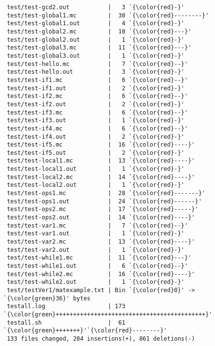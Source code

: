 \begin{lstlisting}
 test/test-gcd2.out           |   3 `{\color{red}-}'
 test/test-global1.mc         |  30 `{\color{red}--------}'
 test/test-global1.out        |   4 `{\color{red}-}'
 test/test-global2.mc         |  10 `{\color{red}---}'
 test/test-global2.out        |   1 `{\color{red}-}'
 test/test-global3.mc         |  11 `{\color{red}---}'
 test/test-global3.out        |   1 `{\color{red}-}'
 test/test-hello.mc           |   7 `{\color{red}--}'
 test/test-hello.out          |   3 `{\color{red}-}'
 test/test-if1.mc             |   6 `{\color{red}--}'
 test/test-if1.out            |   2 `{\color{red}-}'
 test/test-if2.mc             |   6 `{\color{red}--}'
 test/test-if2.out            |   2 `{\color{red}-}'
 test/test-if3.mc             |   6 `{\color{red}--}'
 test/test-if3.out            |   1 `{\color{red}-}'
 test/test-if4.mc             |   6 `{\color{red}--}'
 test/test-if4.out            |   2 `{\color{red}-}'
 test/test-if5.mc             |  16 `{\color{red}----}'
 test/test-if5.out            |   2 `{\color{red}-}'
 test/test-local1.mc          |  13 `{\color{red}----}'
 test/test-local1.out         |   1 `{\color{red}-}'
 test/test-local2.mc          |  14 `{\color{red}----}'
 test/test-local2.out         |   1 `{\color{red}-}'
 test/test-ops1.mc            |  28 `{\color{red}-------}'
 test/test-ops1.out           |  24 `{\color{red}------}'
 test/test-ops2.mc            |  17 `{\color{red}-----}'
 test/test-ops2.out           |  14 `{\color{red}----}'
 test/test-var1.mc            |   7 `{\color{red}--}'
 test/test-var1.out           |   1 `{\color{red}-}'
 test/test-var2.mc            |  13 `{\color{red}----}'
 test/test-var2.out           |   1 `{\color{red}-}'
 test/test-while1.mc          |  11 `{\color{red}---}'
 test/test-while1.out         |   6 `{\color{red}--}'
 test/test-while2.mc          |  16 `{\color{red}----}'
 test/test-while2.out         |   1 `{\color{red}-}'
 test/testVer1/matexample.txt | Bin `{\color{red}0}' -> `{\color{green}36}' bytes
 testall.log                  | 173 `{\color{green}+++++++++++++++++++++++++++++++++++++++++++}'
 testall.sh                   |  61 `{\color{green}+++++++}'`{\color{red}--------}'
 133 files changed, 204 insertions(+), 861 deletions(-)


\end{lstlisting}
